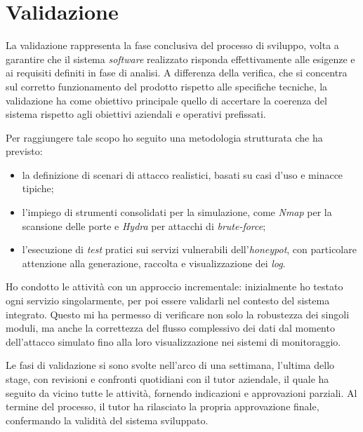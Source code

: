 \section{Validazione}
La validazione rappresenta la fase conclusiva del processo di sviluppo, volta a garantire che il sistema \textit{software} realizzato risponda effettivamente alle esigenze e ai requisiti definiti in fase di analisi. A differenza della verifica, che si concentra sul corretto funzionamento del prodotto rispetto alle specifiche tecniche, la validazione ha come obiettivo principale quello di accertare la coerenza del sistema rispetto agli obiettivi aziendali e operativi prefissati.  

Per raggiungere tale scopo ho seguito una metodologia strutturata che ha previsto:
\begin{itemize}
    \item la definizione di scenari di attacco realistici, basati su casi d'uso e minacce tipiche;
    \item l'impiego di strumenti consolidati per la simulazione, come \textit{Nmap} per la scansione delle porte e \textit{Hydra} per attacchi di \textit{brute-force};
    \item l'esecuzione di \textit{test} pratici sui servizi vulnerabili dell'\textit{honeypot}, con particolare attenzione alla generazione, raccolta e visualizzazione dei \textit{log}.
\end{itemize}

Ho condotto le attività con un approccio incrementale: inizialmente ho testato ogni servizio singolarmente, per poi essere validarli nel contesto del sistema integrato. Questo mi ha permesso di verificare non solo la robustezza dei singoli moduli, ma anche la correttezza del flusso complessivo dei dati dal momento dell'attacco simulato fino alla loro visualizzazione nei sistemi di monitoraggio.  

Le fasi di validazione si sono svolte nell'arco di una settimana, l'ultima dello stage, con revisioni e confronti quotidiani con il tutor aziendale, il quale ha seguito da vicino tutte le attività, fornendo indicazioni e approvazioni parziali. Al termine del processo, il tutor ha rilasciato la propria approvazione finale, confermando la validità del sistema sviluppato.  

